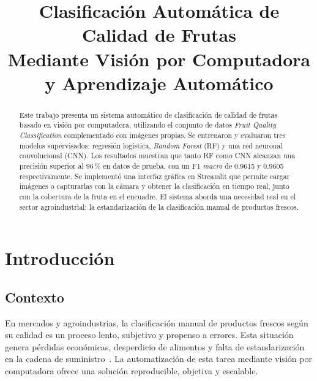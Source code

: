\documentclass[conference]{IEEEtran}
\begin{document}
\title{Clasificación Automática de Calidad de Frutas\\Mediante Visión por Computadora y Aprendizaje Automático}

\author{
}

\maketitle

\begin{abstract}
Este trabajo presenta un sistema automático de clasificación de calidad de frutas basado en visión por computadora, utilizando el conjunto de datos \emph{Fruit Quality Classification} complementado con imágenes propias. Se entrenaron y evaluaron tres modelos supervisados: regresión logística, \emph{Random Forest} (RF) y una red neuronal convolucional (CNN). Los resultados muestran que tanto RF como CNN alcanzan una precisión superior al 96\,\% en datos de prueba, con un F1 \emph{macro} de 0.9615 y 0.9605 respectivamente. Se implementó una interfaz gráfica en Streamlit que permite cargar imágenes o capturarlas con la cámara y obtener la clasificación en tiempo real, junto con la cobertura de la fruta en el encuadre. El sistema aborda una necesidad real en el sector agroindustrial: la estandarización de la clasificación manual de productos frescos.
\end{abstract}

\section{Introducción}

\subsection{Contexto}
En mercados y agroindustrias, la clasificación manual de productos frescos según su calidad es un proceso lento, subjetivo y propenso a errores. Esta situación genera pérdidas económicas, desperdicio de alimentos y falta de estandarización en la cadena de suministro~\cite{kaggle_fruit}. La automatización de esta tarea mediante visión por computadora ofrece una solución reproducible, objetiva y escalable.
\end{document}
